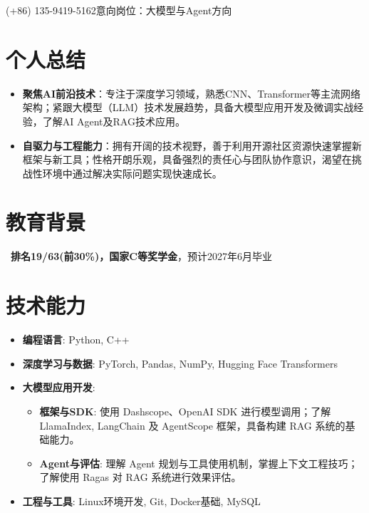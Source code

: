\documentclass{resume}
\begin{document}


 {(+86) 135-9419-5162}{意向岗位：大模型与Agent方向}

\section{个人总结}
\begin{itemize}
    \item \textbf{聚焦AI前沿技术}：专注于深度学习领域，熟悉CNN、Transformer等主流网络架构；紧跟大模型（LLM）技术发展趋势，具备大模型应用开发及微调实战经验，了解AI Agent及RAG技术应用。
    \item \textbf{自驱力与工程能力}：拥有开阔的技术视野，善于利用开源社区资源快速掌握新框架与新工具；性格开朗乐观，具备强烈的责任心与团队协作意识，渴望在挑战性环境中通过解决实际问题实现快速成长。
\end{itemize}

\section{教育背景}
\ \textbf{排名19/63(前30\%)，国家C等奖学金}，预计2027年6月毕业

\section{技术能力}
\begin{itemize}[parsep=0.2ex]
  \item \textbf{编程语言}: Python, C++
  \item \textbf{深度学习与数据}: PyTorch, Pandas, NumPy, Hugging Face Transformers
  \item \textbf{大模型应用开发}:
  \begin{itemize}
      \item \textbf{框架与SDK}: 使用 Dashscope、OpenAI SDK 进行模型调用；了解 LlamaIndex, LangChain 及 AgentScope 框架，具备构建 RAG 系统的基础能力。
      \item \textbf{Agent与评估}: 理解 Agent 规划与工具使用机制，掌握上下文工程技巧；了解使用 Ragas 对 RAG 系统进行效果评估。
  \end{itemize}
  \item \textbf{工程与工具}: Linux环境开发, Git, Docker基础, MySQL
\end{itemize}
\end{document}

